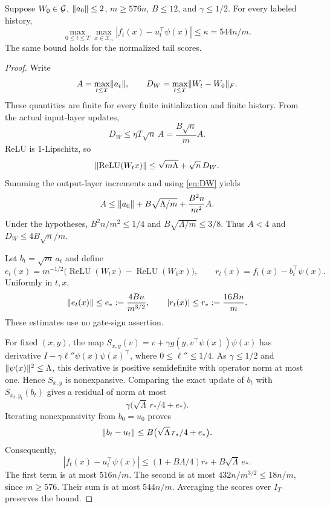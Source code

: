 \documentclass[11pt,letterpaper,pmlr,twoside]{jmlr}
\newcommand{\X}{\mathcal X}\newcommand{\Hc}{\mathcal H}
\newcommand{\relu}{\operatorname{ReLU}}\newcommand{\dc}{\operatorname{dc}}
\begin{document}
\begin{lemma}
\label{lem:score}
Suppose $W_0\in\mathcal G$, $\lVert a_0\rVert\le2$, $m\ge576n$, $B\le12$, and $\gamma\le1/2$. For every labeled history,
\begin{equation}
 \max_{0\le t\le T}\max_{x\in\X_n}
   |f_t(x)-u_t^\top\psi(x)|\le\kappa=544n/m.
 \label{eq:score-compare}
\end{equation}
The same bound holds for the normalized tail scores.
\end{lemma}
\begin{proof}
Write
\[
 A=\max_{t\le T}\lVert a_t\rVert,\qquad
 D_W=\max_{t\le T}\lVert W_t-W_0\rVert_F.
\]
These quantities are finite for every finite initialization and finite history. From the actual input-layer updates,
\begin{equation}
 D_W\le\eta T\sqrt n\, A=\frac{B\sqrt n}{m}A.
 \label{eq:DW}
\end{equation}
ReLU is 1-Lipschitz, so
\[
 \norm{\relu(W_tx)}\le\sqrt{m\Lambda}+\sqrt n\,D_W.
\]
Summing the output-layer increments and using \eqref{eq:DW} yields
\[
 A\le\lVert a_0\rVert+B\sqrt{\Lambda/m}+\frac{B^2n}{m^2}A.
\]
Under the hypotheses, $B^2n/m^2\le1/4$ and $B\sqrt{\Lambda/m}\le3/8$. Thus $A<4$ and $D_W\le4B\sqrt n/m$.

Let $b_t=\sqrt m\,a_t$ and define
\[
 e_t(x)=m^{-1/2}\bigl(\relu(W_tx)-\relu(W_0x)\bigr),
 \qquad r_t(x)=f_t(x)-b_t^\top\psi(x).
\]
Uniformly in $t,x$,
\begin{equation}
 \lVert e_t(x)\rVert\le e_*:=\frac{4Bn}{m^{3/2}},
 \qquad |r_t(x)|\le r_*:=\frac{16Bn}{m}.
 \label{eq:residuals}
\end{equation}
These estimates use no gate-sign assertion.

For fixed $(x,y)$, the map $S_{x,y}(v)=v+\gamma g(y,v^\top\psi(x))\psi(x)$ has derivative $I-\gamma\ell''\psi(x)\psi(x)^\top$, where $0\le\ell''\le1/4$. As $\gamma\le1/2$ and $\lVert \psi(x)\rVert^2\le\Lambda$, this derivative is positive semidefinite with operator norm at most one. Hence $S_{x,y}$ is nonexpansive. Comparing the exact update of $b_t$ with $S_{x_t,y_t}(b_t)$ gives a residual of norm at most
\[
 \gamma\bigl(\sqrt\Lambda\,r_*/4+e_*\bigr).
\]
Iterating nonexpansivity from $b_0=u_0$ proves
\[
 \lVert b_t-u_t\rVert\le B\bigl(\sqrt\Lambda\,r_*/4+e_*\bigr).
\]
Consequently,
\[
 |f_t(x)-u_t^\top\psi(x)|
 \le(1+B\Lambda/4)r_*+B\sqrt\Lambda\,e_*.
\]
The first term is at most $516n/m$. The second is at most $432n/m^{3/2}\le18n/m$, since $m\ge576$. Their sum is at most $544n/m$. Averaging the scores over $I_T$ preserves the bound.
\end{proof}
\end{document}
